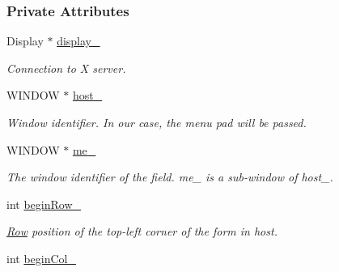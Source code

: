 \subsubsection*{Private Attributes}
\begin{DoxyCompactItemize}
\item 
Display $\ast$ \hyperlink{structEditField_a4ea3854a4dd00bd461f15085fe2c46c9}{display\+\_\+}\hypertarget{structEditField_a4ea3854a4dd00bd461f15085fe2c46c9}{}\label{structEditField_a4ea3854a4dd00bd461f15085fe2c46c9}

\begin{DoxyCompactList}\small\item\em Connection to X server. \end{DoxyCompactList}\item 
W\+I\+N\+D\+OW $\ast$ \hyperlink{structEditField_a9846d9e596a3ccf5c6e3c13bed972a37}{host\+\_\+}\hypertarget{structEditField_a9846d9e596a3ccf5c6e3c13bed972a37}{}\label{structEditField_a9846d9e596a3ccf5c6e3c13bed972a37}

\begin{DoxyCompactList}\small\item\em Window identifier. In our case, the menu pad will be passed. \end{DoxyCompactList}\item 
W\+I\+N\+D\+OW $\ast$ \hyperlink{structEditField_a9ec89f7107b91a0639d68ad00a0655ca}{me\+\_\+}\hypertarget{structEditField_a9ec89f7107b91a0639d68ad00a0655ca}{}\label{structEditField_a9ec89f7107b91a0639d68ad00a0655ca}

\begin{DoxyCompactList}\small\item\em The window identifier of the field. {\ttfamily me\+\_\+} is a sub-\/window of {\ttfamily host\+\_\+}. \end{DoxyCompactList}\item 
int \hyperlink{structEditField_a8773fc26b988cb4c363f80ffc29dc087}{begin\+Row\+\_\+}\hypertarget{structEditField_a8773fc26b988cb4c363f80ffc29dc087}{}\label{structEditField_a8773fc26b988cb4c363f80ffc29dc087}

\begin{DoxyCompactList}\small\item\em \hyperlink{structRow}{Row} position of the top-\/left corner of the form in {\ttfamily host}. \end{DoxyCompactList}\item 
int \hyperlink{structEditField_a56a7a0f90739b29bcda8d2cb1a705388}{begin\+Col\+\_\+}\hypertarget{structEditField_a56a7a0f90739b29bcda8d2cb1a705388}{}\label{structEditField_a56a7a0f90739b29bcda8d2cb1a705388}


\end{DoxyCompactItemize}
